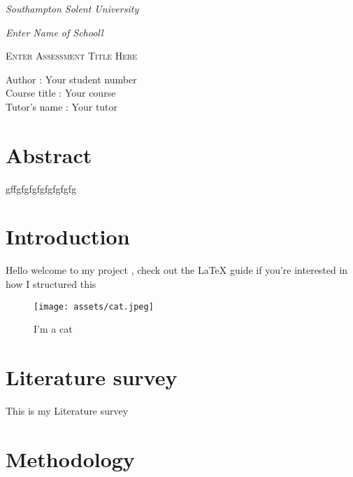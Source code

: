 \documentclass[12pt,a4paper]{article}
\begin{document}
\begin{titlepage}
{\fontsize{14}{12} \emph{Southampton Solent University}\par}
{\fontsize{14}{12}  \emph{Enter Name of Schooll} \par}
\centering
\vspace{10 cm}
{\scshape\Huge Enter Assessment Title Here\par}
\vspace{10cm}	
\begin{flushleft}

Author	        \hspace{1.12cm} 	: Your student number   \\
Course title	\hspace{0.2cm} 	: Your course  \\
Tutor's name	\hspace{0.00cm}       : Your tutor   \\

\end{flushleft}
 
\end{titlepage}

\tableofcontents

\clearpage

\listoffigures

\clearpage


\section{Abstract}
gffgfgfgfgfgfgfgfg 
\section{Introduction}

Hello welcome to my project , check out the LaTeX guide if you're interested in how I structured this  \citep{latex:guide}

\begin{figure}[h!]
	\centering
	\texttt{[image: assets/cat.jpeg]}
	 \caption{I'm a cat}
	 \label{fig:cat}
\end{figure}




\section{Literature survey}
\citet[p.~2]{latex:guide}
 This is my Literature survey

\section{Methodology}
\end{document}
